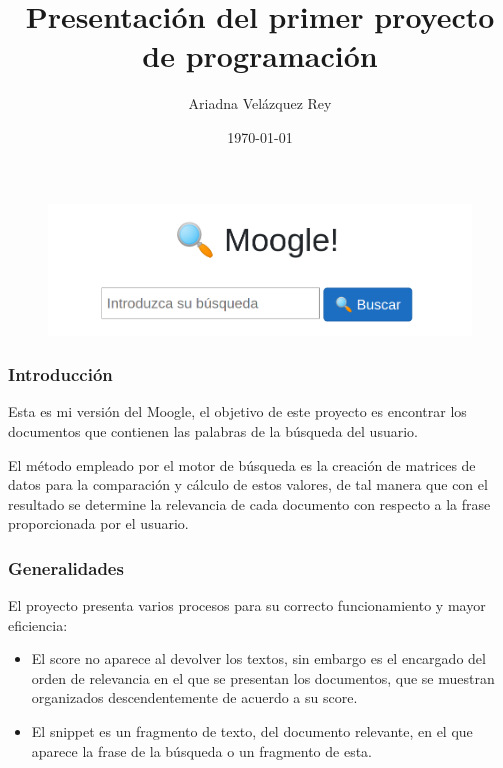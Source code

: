 \documentclass{beamer}
\title{Presentación del primer proyecto de programación}
\author{Ariadna Velázquez Rey}
\date{\today}
\begin{document}
\begin{frame}
    \maketitle

    \begin{figure}[h]
        \centering
        \includegraphics[width=1\textwidth]{moogle}
    \end{figure}
\end{frame}

\begin{frame}
    \frametitle{Introducción}
    Esta es mi versión del Moogle, el objetivo de este proyecto es encontrar los documentos que contienen las palabras 
    de la búsqueda del usuario. 

    El método empleado por el motor de búsqueda es la creación de matrices de datos para la comparación y cálculo de 
    estos valores, de tal manera que con el resultado se determine la relevancia de cada documento con respecto a la 
    frase proporcionada por el usuario.
\end{frame}

\begin{frame}
    \frametitle{Generalidades}
      El proyecto presenta varios procesos para su correcto funcionamiento y mayor eficiencia:

    \begin{itemize}
        \item El score no aparece al devolver los textos, sin embargo es el encargado del orden de relevancia en el 
        que se presentan los documentos, que se muestran organizados descendentemente de acuerdo a su score.
        \item El snippet es un fragmento de texto, del documento relevante, en el que aparece la frase de la búsqueda 
        o un fragmento de esta.
    \end{itemize}    
\end{frame}
\end{document}
